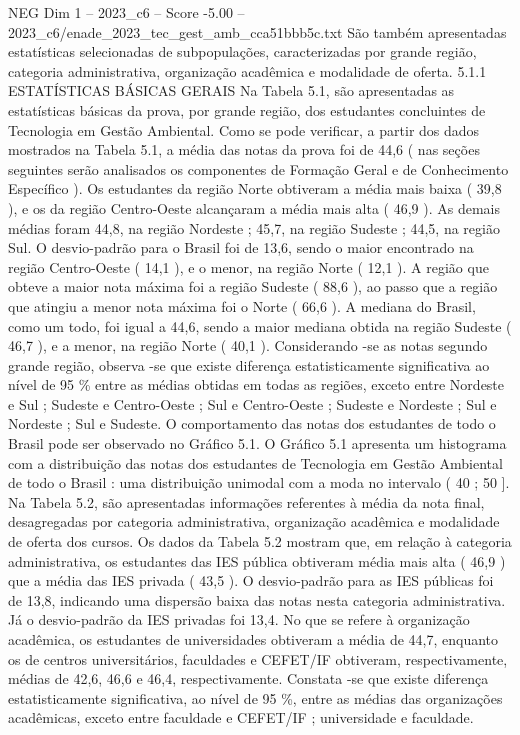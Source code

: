\begin{textsample}{NEG Dim 1 – 2023\_c6 – Score -5.00 – 2023\_c6/enade\_2023\_tec\_gest\_amb\_cca51bbb5c.txt}
São também apresentadas estatísticas selecionadas de subpopulações, caracterizadas por grande região, categoria administrativa, organização acadêmica e modalidade de oferta. 5.1.1 ESTATÍSTICAS BÁSICAS GERAIS Na Tabela 5.1, são apresentadas as estatísticas básicas da prova, por grande região, dos estudantes concluintes de Tecnologia em Gestão Ambiental.
Como se pode verificar, a partir dos dados mostrados na Tabela 5.1, a média das notas da prova foi de 44,6 ( nas seções seguintes serão analisados os componentes de Formação Geral e de Conhecimento Específico ).
Os estudantes da região Norte obtiveram a média mais baixa ( 39,8 ), e os da região Centro-Oeste alcançaram a média mais alta ( 46,9 ).
As demais médias foram 44,8, na região Nordeste ; 45,7, na região Sudeste ; 44,5, na região Sul.
O desvio-padrão para o Brasil foi de 13,6, sendo o maior encontrado na região Centro-Oeste ( 14,1 ), e o menor, na região Norte ( 12,1 ).
A região que obteve a maior nota máxima foi a região Sudeste ( 88,6 ), ao passo que a região que atingiu a menor nota máxima foi o Norte ( 66,6 ).
A mediana do Brasil, como um todo, foi igual a 44,6, sendo a maior mediana obtida na região Sudeste ( 46,7 ), e a menor, na região Norte ( 40,1 ).
Considerando -se as notas segundo grande região, observa -se que existe diferença estatisticamente significativa ao nível de 95 \% entre as médias obtidas em todas as regiões, exceto entre Nordeste e Sul ; Sudeste e Centro-Oeste ; Sul e Centro-Oeste ; Sudeste e Nordeste ; Sul e Nordeste ; Sul e Sudeste.
O comportamento das notas dos estudantes de todo o Brasil pode ser observado no Gráfico 5.1.
O Gráfico 5.1 apresenta um histograma com a distribuição das notas dos estudantes de Tecnologia em Gestão Ambiental de todo o Brasil : uma distribuição unimodal com a moda no intervalo ( 40 ; 50 ].
Na Tabela 5.2, são apresentadas informações referentes à média da nota final, desagregadas por categoria administrativa, organização acadêmica e modalidade de oferta dos cursos.
Os dados da Tabela 5.2 mostram que, em relação à categoria administrativa, os estudantes das IES pública obtiveram média mais alta ( 46,9 ) que a média das IES privada ( 43,5 ).
O desvio-padrão para as IES públicas foi de 13,8, indicando uma dispersão baixa das notas nesta categoria administrativa.
Já o desvio-padrão da IES privadas foi 13,4.
No que se refere à organização acadêmica, os estudantes de universidades obtiveram a média de 44,7, enquanto os de centros universitários, faculdades e CEFET/IF obtiveram, respectivamente, médias de 42,6, 46,6 e 46,4, respectivamente.
Constata -se que existe diferença estatisticamente significativa, ao nível de 95 \%, entre as médias das organizações acadêmicas, exceto entre faculdade e CEFET/IF ; universidade e faculdade.

\end{textsample}
